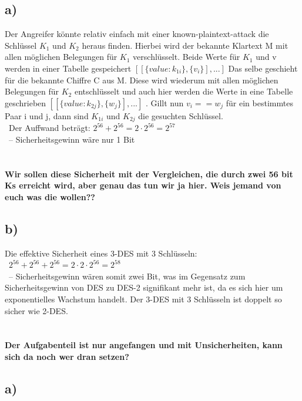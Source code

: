 \documentclass[ngerman]{fbi-aufgabenblatt}
\begin{document}
	\setcounter{section}{0}

	
	\subsection*{a)}
	Der Angreifer könnte relativ einfach mit einer known-plaintext-attack die Schlüssel $K_{1}$ und $K_{2}$ heraus finden.
	Hierbei wird der bekannte Klartext M mit allen möglichen Belegungen für $K_{1}$ verschlüsselt. Beide Werte für $K_{1}$ und v werden in einer Tabelle gespeichert $[[\{value: k_{1i}\} ,\{v_{i}\}], ... ]$ Das selbe geschieht für die bekannte Chiffre C aus M. Diese wird wiederum mit allen möglichen Belegungen für $K_{2}$ entschlüsselt und auch hier werden die Werte in eine Tabelle geschrieben $[[\{value: k_{2j}\} ,\{w_{j}\}], ... ]$ . Gillt nun $v_{i} == w_{j}$ für ein bestimmtes Paar i und j, dann sind $K_{1i}$ und $K_{2j}$ die gesuchten Schlüssel.\\\
	Der Auffwand beträgt:
	$2^{56}+2^{56} =2\cdot 2^{56} =2^{57}$\\\
	–  Sicherheitsgewinn wäre nur 1 Bit
	\\\\\\
	 \textbf{Wir sollen diese Sicherheit mit der Vergleichen, die durch zwei 56 bit Ks erreicht wird, aber genau das tun wir ja hier. Weis jemand von euch was die wollen??}
		
	\subsection*{b)}
	Die effektive Sicherheit eines 3-DES mit 3 Schlüsseln:\\\
	$2^{56}+2^{56}+2^{56} =2\cdot 2\cdot 2^{56} =2^{58}$\\\
	–  Sicherheitsgewinn wären somit zwei Bit, was im Gegensatz zum Sicherheitsgewinn von DES zu DES-2 signifikant mehr ist, da es sich hier um exponentielles Wachstum handelt. Der 3-DES mit 3 Schlüsseln ist doppelt so sicher wie
	 2-DES.
	 	\\\\\\
	 \textbf{Der Aufgabenteil ist nur angefangen und mit Unsicherheiten, kann sich da noch wer dran setzen?}
		
    
	\aufgabe{Cipher-Block-Chaining-Modus}
	
	\subsection*{a)}
	
\end{document}

